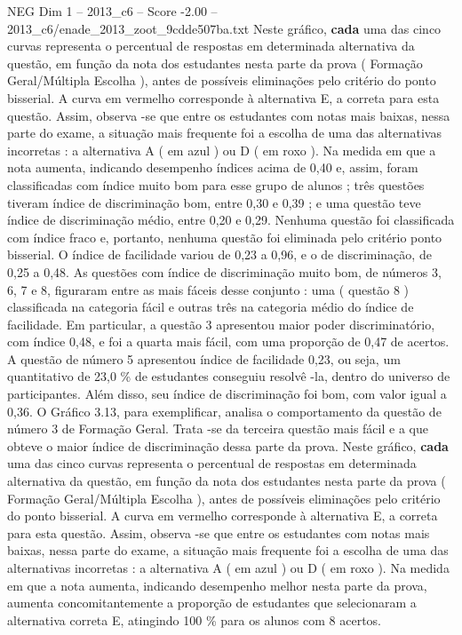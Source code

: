 \begin{textsample}{NEG Dim 1 – 2013\_c6 – Score -2.00 – 2013\_c6/enade\_2013\_zoot\_9cdde507ba.txt}
Neste gráfico, \textbf{cada} uma das cinco curvas representa o percentual de respostas em determinada alternativa da questão, em função da nota dos estudantes nesta parte da prova ( Formação Geral/Múltipla Escolha ), antes de possíveis eliminações pelo critério do ponto bisserial.
A curva em vermelho corresponde à alternativa E, a correta para esta questão.
Assim, observa -se que entre os estudantes com notas mais baixas, nessa parte do exame, a situação mais frequente foi a escolha de uma das alternativas incorretas : a alternativa A ( em azul ) ou D ( em roxo ).
Na medida em que a nota aumenta, indicando desempenho índices acima de 0,40 e, assim, foram classificadas com índice muito bom para esse grupo de alunos ; três questões tiveram índice de discriminação bom, entre 0,30 e 0,39 ; e uma questão teve índice de discriminação médio, entre 0,20 e 0,29.
Nenhuma questão foi classificada com índice fraco e, portanto, nenhuma questão foi eliminada pelo critério ponto bisserial.
O índice de facilidade variou de 0,23 a 0,96, e o de discriminação, de 0,25 a 0,48.
As questões com índice de discriminação muito bom, de números 3, 6, 7 e 8, figuraram entre as mais fáceis desse conjunto : uma ( questão 8 ) classificada na categoria fácil e outras três na categoria médio do índice de facilidade.
Em particular, a questão 3 apresentou maior poder discriminatório, com índice 0,48, e foi a quarta mais fácil, com uma proporção de 0,47 de acertos.
A questão de número 5 apresentou índice de facilidade 0,23, ou seja, um quantitativo de 23,0 \% de estudantes conseguiu resolvê -la, dentro do universo de participantes.
Além disso, seu índice de discriminação foi bom, com valor igual a 0,36.
O Gráfico 3.13, para exemplificar, analisa o comportamento da questão de número 3 de Formação Geral.
Trata -se da terceira questão mais fácil e a que obteve o maior índice de discriminação dessa parte da prova.
Neste gráfico, \textbf{cada} uma das cinco curvas representa o percentual de respostas em determinada alternativa da questão, em função da nota dos estudantes nesta parte da prova ( Formação Geral/Múltipla Escolha ), antes de possíveis eliminações pelo critério do ponto bisserial.
A curva em vermelho corresponde à alternativa E, a correta para esta questão.
Assim, observa -se que entre os estudantes com notas mais baixas, nessa parte do exame, a situação mais frequente foi a escolha de uma das alternativas incorretas : a alternativa A ( em azul ) ou D ( em roxo ).
Na medida em que a nota aumenta, indicando desempenho melhor nesta parte da prova, aumenta concomitantemente a proporção de estudantes que selecionaram a alternativa correta E, atingindo 100 \% para os alunos com 8 acertos.

\end{textsample}
